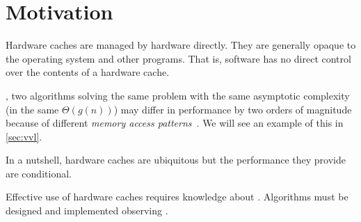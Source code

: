 \section{Motivation} %

Hardware caches are managed by hardware directly.  They are generally opaque to the
operating system and other programs.  That is, software has no direct control over the
contents of a hardware cache.

, two algorithms solving the same
problem with the same asymptotic complexity (in the same \(\Theta(g(n))\)) may differ in
performance by two orders of magnitude because of different \emph{memory access
patterns}~\cite{bigos}.  We will see an example of this in
\cref{sec:vvl}.

In a nutshell, hardware caches are ubiquitous but the performance  they provide are conditional.
\begin{comment}
   To use them effectively,
   algorithms must be designed and implemented with the architecture
   of hardware caches in mind.
\end{comment}
Effective use of hardware caches requires knowledge about .  Algorithms must be designed and implemented observing .


